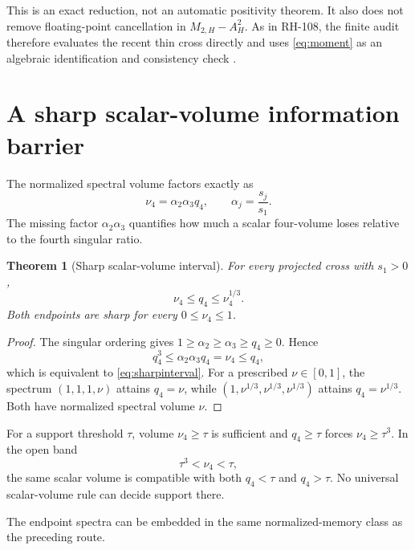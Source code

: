 \documentclass[11pt]{article}
\newtheorem{theorem}{Theorem}[section]
\theoremstyle{definition}
\theoremstyle{remark}
\begin{document}
This is an exact reduction, not an automatic positivity theorem.  It also
does not remove floating-point cancellation in $M_{2,H}-A_H^2$.  As in
RH-108, the finite audit therefore evaluates the recent thin cross directly
and uses \eqref{eq:moment} as an algebraic identification and consistency
check \citep{Higham2002}.

\section{A sharp scalar-volume information barrier}
\label{sec:barrier}

The normalized spectral volume factors exactly as
\begin{equation}
 \nu_4=\alpha_2\alpha_3q_4,
 \qquad \alpha_j=\frac{s_j}{s_1}.
 \label{eq:lossfactor}
\end{equation}
The missing factor $\alpha_2\alpha_3$ quantifies how much a scalar
four-volume loses relative to the fourth singular ratio.

\begin{theorem}[Sharp scalar-volume interval]
\label{thm:interval}
For every projected cross with $s_1>0$,
\begin{equation}
 \nu_4\le q_4\le\nu_4^{1/3}.
 \label{eq:sharpinterval}
\end{equation}
Both endpoints are sharp for every $0\le\nu_4\le1$.
\end{theorem}

\begin{proof}
The singular ordering gives
$1\ge\alpha_2\ge\alpha_3\ge q_4\ge0$.  Hence
\[
 q_4^3\le\alpha_2\alpha_3q_4=\nu_4\le q_4,
\]
which is equivalent to \eqref{eq:sharpinterval}.  For a prescribed
$\nu\in[0,1]$, the spectrum
$(1,1,1,\nu)$ attains $q_4=\nu$, while
$(1,\nu^{1/3},\nu^{1/3},\nu^{1/3})$ attains
$q_4=\nu^{1/3}$.  Both have normalized spectral volume $\nu$.
\end{proof}

For a support threshold $\tau$, volume $\nu_4\ge\tau$ is sufficient and
$q_4\ge\tau$ forces $\nu_4\ge\tau^3$.  In the open band
\begin{equation}
 \tau^3<\nu_4<\tau,
 \label{eq:band}
\end{equation}
the same scalar volume is compatible with both $q_4<\tau$ and
$q_4>\tau$.  No universal scalar-volume rule can decide support there.

The endpoint spectra can be embedded in the same normalized-memory class as
the preceding route.
\end{document}

